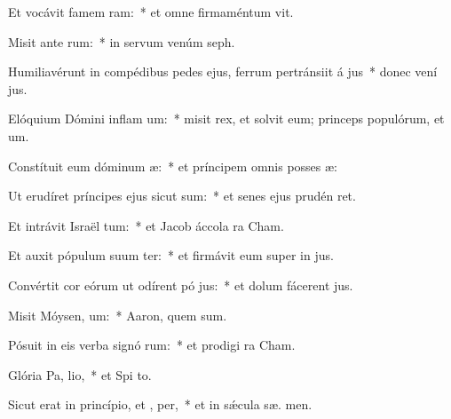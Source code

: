 \item Et vocávit famem  ram:~* et omne firmaméntum  vit.
\item Misit ante  rum:~* in servum venúm  seph.
\item Humiliavérunt in compédibus pedes ejus, ferrum pertránsiit á jus~* donec vení  jus.
\item Elóquium Dómini inflam um:~* misit rex, et solvit eum; princeps populórum, et  um.
\item Constítuit eum dóminum  æ:~* et príncipem omnis posses æ:
\item Ut erudíret príncipes ejus sicut sum:~* et senes ejus prudén ret.
\item Et intrávit Israël  tum:~* et Jacob áccola   ra Cham.
\item Et auxit pópulum suum ter:~* et firmávit eum super in jus.
\item Convértit cor eórum ut odírent pó jus:~* et dolum fácerent   jus.
\item Misit Móysen,  um:~* Aaron, quem  sum.
\item Pósuit in eis verba signó rum:~* et prodigi  ra Cham.
\item Glória Pa,  lio,~* et Spi to.
\item Sicut erat in princípio, et ,  per,~* et in sǽcula sæ. men.
